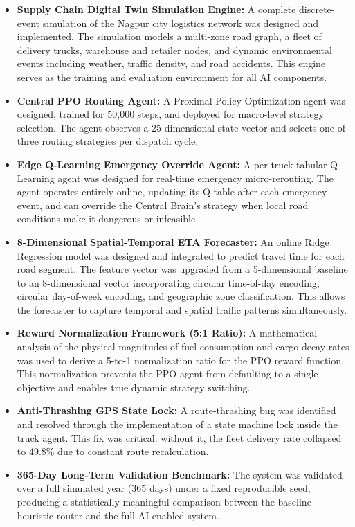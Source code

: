 \begin{itemize}
    \item \textbf{Supply Chain Digital Twin Simulation Engine:} A complete
    discrete-event simulation of the Nagpur city logistics network was designed and
    implemented. The simulation models a multi-zone road graph, a fleet of delivery
    trucks, warehouse and retailer nodes, and dynamic environmental events including
    weather, traffic density, and road accidents. This engine serves as the training
    and evaluation environment for all AI components.

    \item \textbf{Central PPO Routing Agent:} A Proximal Policy Optimization agent
    was designed, trained for 50,000 steps, and deployed for macro-level strategy
    selection. The agent observes a 25-dimensional state vector and selects one of
    three routing strategies per dispatch cycle.

    \item \textbf{Edge Q-Learning Emergency Override Agent:} A per-truck tabular
    Q-Learning agent was designed for real-time emergency micro-rerouting. The agent
    operates entirely online, updating its Q-table after each emergency event, and
    can override the Central Brain's strategy when local road conditions make it
    dangerous or infeasible.

    \item \textbf{8-Dimensional Spatial-Temporal ETA Forecaster:} An online Ridge
    Regression model was designed and integrated to predict travel time for each road
    segment. The feature vector was upgraded from a 5-dimensional baseline to an
    8-dimensional vector incorporating circular time-of-day encoding, circular
    day-of-week encoding, and geographic zone classification. This allows the
    forecaster to capture temporal and spatial traffic patterns simultaneously.

    \item \textbf{Reward Normalization Framework (5:1 Ratio):} A mathematical
    analysis of the physical magnitudes of fuel consumption and cargo decay rates was
    used to derive a 5-to-1 normalization ratio for the PPO reward function. This
    normalization prevents the PPO agent from defaulting to a single objective and
    enables true dynamic strategy switching.

    \item \textbf{Anti-Thrashing GPS State Lock:} A route-thrashing bug was
    identified and resolved through the implementation of a state machine lock inside
    the truck agent. This fix was critical: without it, the fleet delivery rate
    collapsed to 49.8\% due to constant route recalculation.

    \item \textbf{365-Day Long-Term Validation Benchmark:} The system was validated
    over a full simulated year (365 days) under a fixed reproducible seed, producing
    a statistically meaningful comparison between the baseline heuristic router and
    the full AI-enabled system.
\end{itemize}

